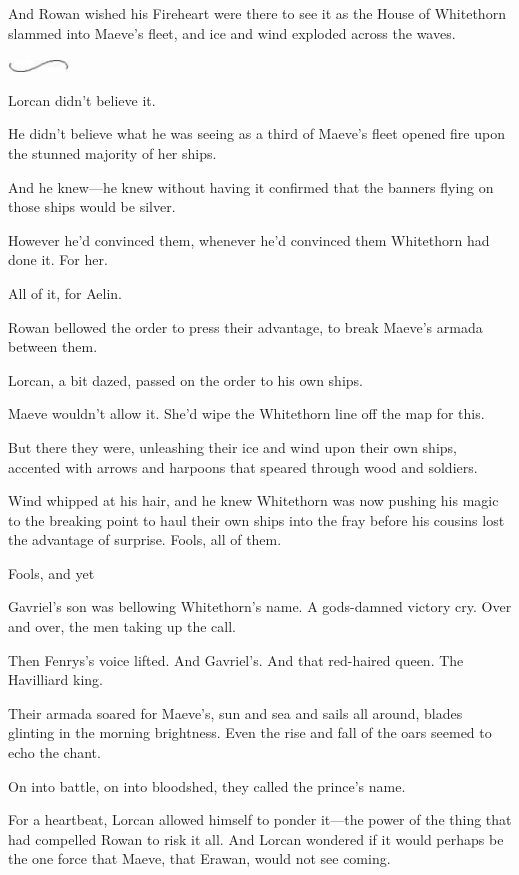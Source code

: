 And Rowan wished his Fireheart were there to see it as the House of Whitethorn slammed into Maeve's fleet, and ice and wind exploded across the waves.

\begin{center}
	\includegraphics[width=0.65in,height=0.13in]{images/seperator}
\end{center}

Lorcan didn't believe it.

He didn't believe what he was seeing as a third of Maeve's fleet opened fire upon the stunned majority of her ships.

And he knew---he knew without having it confirmed that the banners flying on those ships would be silver.

However he'd convinced them, whenever he'd convinced them 
Whitethorn had done it.
For her.

All of it, for Aelin.

Rowan bellowed the order to press their advantage, to break Maeve's armada between them.

Lorcan, a bit dazed, passed on the order to his own ships.

Maeve wouldn't allow it.
She'd wipe the Whitethorn line off the map for this.

But there they were, unleashing their ice and wind upon their own ships, accented with arrows and harpoons that speared through wood and soldiers.

Wind whipped at his hair, and he knew Whitethorn was now pushing his magic to the breaking point to haul their own ships into the fray before his cousins lost the advantage of surprise.
Fools, all of them.

Fools, and yet 

Gavriel's son was bellowing Whitethorn's name.
A gods-damned victory cry.
Over and over, the men taking up the call.

Then Fenrys's voice lifted.
And Gavriel's.
And that red-haired queen.
The Havilliard king.

Their armada soared for Maeve's, sun and sea and sails all around, blades glinting in the morning brightness.
Even the rise and fall of the oars seemed to echo the chant.

On into battle, on into bloodshed, they called the prince's name.

For a heartbeat, Lorcan allowed himself to ponder it---the power of the thing that had compelled Rowan to risk it all.
And Lorcan wondered if it would perhaps be the one force that Maeve, that Erawan, would not see coming.

